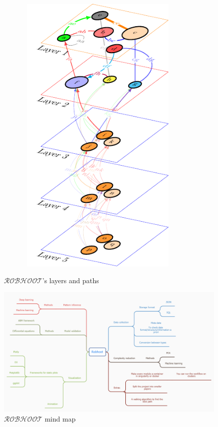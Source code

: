 \documentclass[english,12pt]{article}
\begin{document}
\begin{figure}%
\vspace{-5 in}
\begin{center}
  \hspace{-0.5 in}\includegraphics[width=10cm,height=14cm]{multilayer.pdf}\\
\end{center}
\caption{$\mathcal{ROBHOOT}$'s layers and paths}
\label{}
\end{figure}
  
\newpage
\begin{figure}
\begin{center}
\hspace{-0.5 in}\includegraphics[scale=0.3,angle=90]{mindmap.png}
\end{center}
\caption{$\mathcal{ROBHOOT}$ mind map}
\label{}
\end{figure}

\newpage



\printindex
\end{document}
